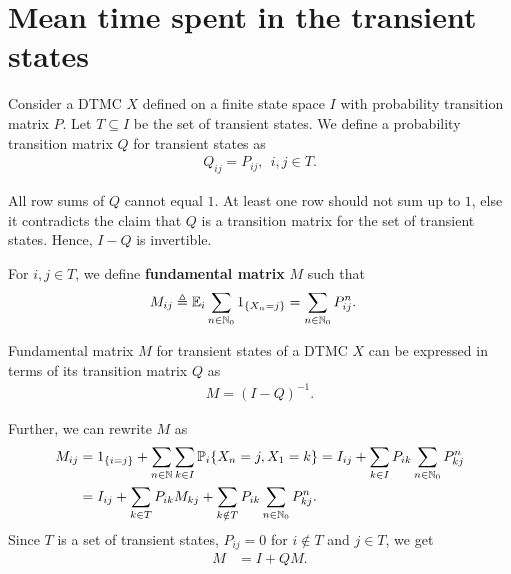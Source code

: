 \documentclass[a4paper,10pt,english]{article}
\begin{document}
\section{Mean time spent in the transient states}
Consider a DTMC $X$ defined on a finite state space $I$ with probability transition matrix $P$. Let $T \subseteq I$ be the set of transient states. 
We define a probability transition matrix $Q$ for transient states as 
\begin{align*}
Q_{ij} = P_{ij},~~i,j \in T.
\end{align*}
\begin{rem} All row sums of $Q$ cannot equal $1$. 
At least one row should not sum up to $1$, else it contradicts the claim that $Q$ is a transition matrix for the set of transient states. Hence, $I-Q$ is invertible. 
\end{rem}
\begin{defn}
For $i,j \in T$, we define \textbf{fundamental matrix} $M$ such that
\begin{align*}
M_{ij} &\triangleq \mathbb{E}_i\sum_{n\in \mathbb{N}_0} 1_{\{X_n = j\}} = \sum_{n \in \mathbb{N}_0}P^n_{ij}.
\end{align*}
\end{defn}
\begin{lem} Fundamental matrix $M$ for transient states of a DTMC $X$ can be expressed in terms of its transition matrix $Q$ as
\begin{align*}
M = (I - Q)^{-1}.
\end{align*}
\end{lem}
Further, we can rewrite $M$ as 
\begin{align*}
M_{ij} &= 1_{\{i = j\}} + \sum_{n \in \mathbb{N}}\sum_{k \in I}\mathbb{P}_i\{X_n = j, X_1 = k\} = I_{ij} + \sum_{k \in I}P_{ik}\sum_{n \in \mathbb{N}_0}P^n_{kj}\\
&= I_{ij} + \sum_{k \in T} P_{ik}M_{kj} + \sum_{k \notin T} P_{ik}\sum_{n \in \mathbb{N}_0}P^n_{kj}.
\end{align*}
Since $T$ is a set of transient states, $P_{ij} = 0$ for $i \notin T$ and $j \in T$, we get 
\begin{align*}
M &= I + QM.
\end{align*}
\end{document}
